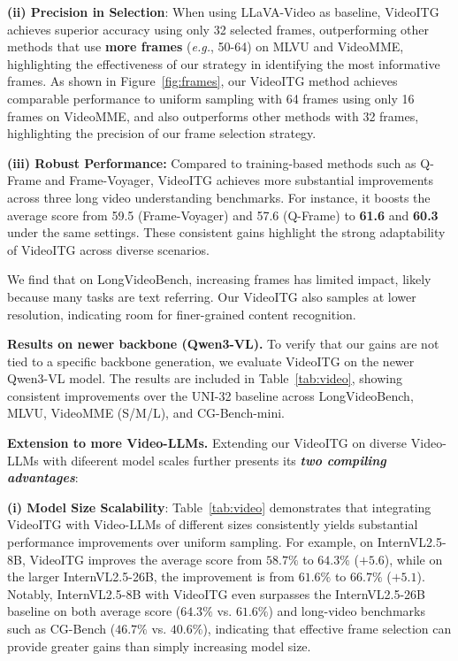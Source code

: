 \textbf{(ii) Precision in Selection}: When using LLaVA-Video as baseline, VideoITG achieves superior accuracy using only 32 selected frames, outperforming other methods that use \textbf{more frames} (\textit{e.g.}, 50-64) on MLVU and VideoMME, highlighting the effectiveness of our strategy in identifying the most informative frames. As shown in Figure~\ref{fig:frames}, our VideoITG method achieves comparable performance to uniform sampling with 64 frames using only 16 frames on VideoMME, and also outperforms other methods with 32 frames, highlighting the precision of our frame selection strategy. 

\textbf{(iii) Robust Performance:} Compared to training-based methods such as Q-Frame and Frame-Voyager, VideoITG achieves more substantial improvements across three long video understanding benchmarks. For instance, it boosts the average score from 59.5 (Frame-Voyager) and 57.6 (Q-Frame) to \textbf{61.6} and \textbf{60.3} under the same settings. These consistent gains highlight the strong adaptability of VideoITG across diverse scenarios.

We find that on LongVideoBench, increasing frames has limited impact, likely because many tasks are text referring. Our VideoITG also samples at lower resolution, indicating room for finer-grained content recognition.
 
\vspace{1mm}
\noindent\textbf{Results on newer backbone (Qwen3-VL).}
To verify that our gains are not tied to a specific backbone generation, we evaluate VideoITG on the newer Qwen3-VL model. The results are included in Table~\ref{tab:video}, showing consistent improvements over the UNI-32 baseline across LongVideoBench, MLVU, VideoMME (S/M/L), and CG-Bench-mini.




\noindent\textbf{Extension to more Video-LLMs.} Extending our VideoITG on diverse Video-LLMs with difeerent model scales further presents its \textbf{\textit{two compiling advantages}}: 

\textbf{(i) Model Size Scalability}:
Table~\ref{tab:video} demonstrates that integrating VideoITG with Video-LLMs of different sizes consistently yields substantial performance improvements over uniform sampling. For example, on InternVL2.5-8B, VideoITG improves the average score from $58.7\%$ to $64.3\%$ ($+5.6$), while on the larger InternVL2.5-26B, the improvement is from $61.6\%$ to $66.7\%$ ($+5.1$). Notably, InternVL2.5-8B with VideoITG even surpasses the InternVL2.5-26B baseline on both average score ($64.3\%$ vs. $61.6\%$) and long-video benchmarks such as CG-Bench ($46.7\%$ vs. $40.6\%$), indicating that effective frame selection can provide greater gains than simply increasing model size. 

